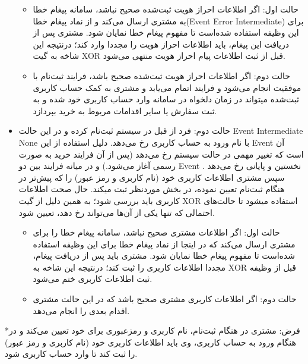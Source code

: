 \documentclass[14pt]{article}
\begin{document}
\begin{flushright}
\begin{itemize}
\begin{flushright}
\begin{itemize}
\item حالت اول: اگر اطلاعات احراز هویت ثبت‌شده صحیح نباشد، سامانه پیغام خطا به مشتری ارسال می‌کند و از نماد پیغام خطا(Event Error Intermediate) برای این وظیفه استفاده شده‌است تا مفهوم پیغام خطا نمایان شود. مشتری پس از دریافت این پیغام، باید اطلاعات احراز هویت را مجددا وارد کند؛ درنتیجه این شاخه به گیت XOR قبل از ثبت اطلاعات پیام احراز هویت منتهی می‌شود.
\item حالت دوم: اگر اطلاعات احراز هویت ثبت‌شده صحیح باشد، فرایند ثبت‌نام با موفقیت انجام می‌شود و فرایند اتمام می‌یابد و مشتری به کمک حساب کاربری ثبت‌شده میتواند در زمان دلخواه در سامانه وارد حساب کاربری خود شده و به ثبت سفارش یا سایر اقدامات مربوط به خرید بپردازد. 
\end{itemize}
\end{flushright}

\item حالت دوم: فرد از قبل در سیستم ثبت‌نام کرده و در این حالت Event Intermediate None با نام ورود به حساب کاربری رخ می‌دهد. دلیل استفاده از این Event آن است که تغییر مهمی در حالت سیستم رخ می‌دهد (پس از آن فرایند خرید به صورت رسمی آغاز می‌شود.) و در میانه فرایند بین دو Event نخستین و پایانی رخ می‌دهد . سپس مشتری اطلاعات کاربری خود (نام کاربری و رمز عبور) را که پیش‌تر در هنگام ثبت‌نام تعیین نموده، در بخش موردنظر ثبت میکند. حال صحت اطلاعات کاربری باید بررسی شود؛ به همین دلیل از گیت XOR  استفاده میشود تا حالت‌های احتمالی که تنها یکی از آن‌ها می‌تواند رخ دهد، تعیین شود.
\begin{flushright}
\begin{itemize}
\item حالت اول: اگر اطلاعات مشتری صحیح نباشد، سامانه پیغام خطا را برای مشتری ارسال می‌کند که در اینجا از نماد پیغام خطا برای این وظیفه استفاده شده‌است تا مفهوم پیغام خطا نمایان شود. مشتری باید پس از دریافت پیغام، مجددا اطلاعات کاربری را ثبت کند؛ درنتیجه این شاخه به XOR قبل از وظیفه ثبت اطلاعات کاربری ختم می‌شود.
\item حالت دوم: اگر اطلاعات کاربری مشتری صحیح باشد که در این حالت مشتری اقدام بعدی را انجام می‌دهد. 
\end{itemize}
\end{flushright}
\end{itemize}
\end{flushright}

*فرض: مشتری در هنگام ثبت‌نام، نام کاربری و رمزعبوری برای خود تعیین می‌کند و در هنگام ورود به حساب کاربری، وی باید اطلاعات کاربری خود (نام کاربری و رمز عبور) را ثبت کند تا وارد حساب کاربری شود.\\
 
\end{document}
